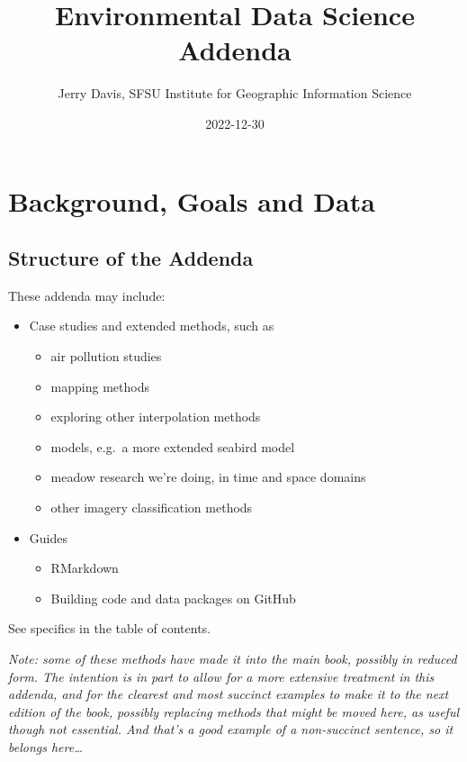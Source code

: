 \documentclass[
]{book}
\title{Environmental Data Science Addenda}
\author{Jerry Davis, SFSU Institute for Geographic Information Science}
\date{2022-12-30}
\providecommand{\tightlist}{%
  \setlength{\itemsep}{0pt}\setlength{\parskip}{0pt}}
\begin{document}
\maketitle

{
\hypersetup{linkcolor=}
\setcounter{tocdepth}{2}
\tableofcontents
}
\listoffigures
\mainmatter

\hypertarget{background-goals-and-data}{%
\chapter{Background, Goals and Data}\label{background-goals-and-data}}

\hypertarget{structure-of-the-addenda}{%
\section{Structure of the Addenda}\label{structure-of-the-addenda}}

These addenda may include:

\begin{itemize}
\tightlist
\item
  Case studies and extended methods, such as

  \begin{itemize}
  \tightlist
  \item
    air pollution studies
  \item
    mapping methods
  \item
    exploring other interpolation methods
  \item
    models, e.g.~a more extended seabird model
  \item
    meadow research we're doing, in time and space domains
  \item
    other imagery classification methods
  \end{itemize}
\item
  Guides

  \begin{itemize}
  \tightlist
  \item
    RMarkdown
  \item
    Building code and data packages on GitHub
  \end{itemize}
\end{itemize}

See specifics in the table of contents.

\emph{Note: some of these methods have made it into the main book, possibly in reduced form. The intention is in part to allow for a more extensive treatment in this addenda, and for the clearest and most succinct examples to make it to the next edition of the book, possibly replacing methods that might be moved here, as useful though not essential. And that's a good example of a non-succinct sentence, so it belongs here\ldots{}}
\end{document}
